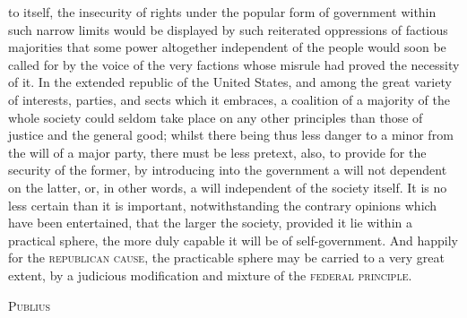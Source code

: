 to itself, the insecurity of rights under the popular form of government within such narrow limits would be displayed by such reiterated oppressions of factious majorities that some power altogether independent of the people would soon be called for by the voice of the very factions whose misrule had proved the necessity of it. In the extended republic of the United States, and among the great variety of interests, parties, and sects which it embraces, a coalition of a majority of the whole society could seldom take place on any other principles than those of justice and the general good; whilst there being thus less danger to a minor from the will of a major party, there must be less pretext, also, to provide for the security of the former, by introducing into the government a will not dependent on the latter, or, in other words, a will independent of the society itself. It is no less certain than it is important, notwithstanding the contrary opinions which have been entertained, that the larger the society, provided it lie within a practical sphere, the more duly capable it will be of self-government. And happily for the \textsc{republican cause}, the practicable sphere may be carried to a very great extent, by a judicious modification and mixture of the \textsc{federal principle}.

\vspace{.5cm}
\textsc{Publius}

\vspace{1.5cm}

